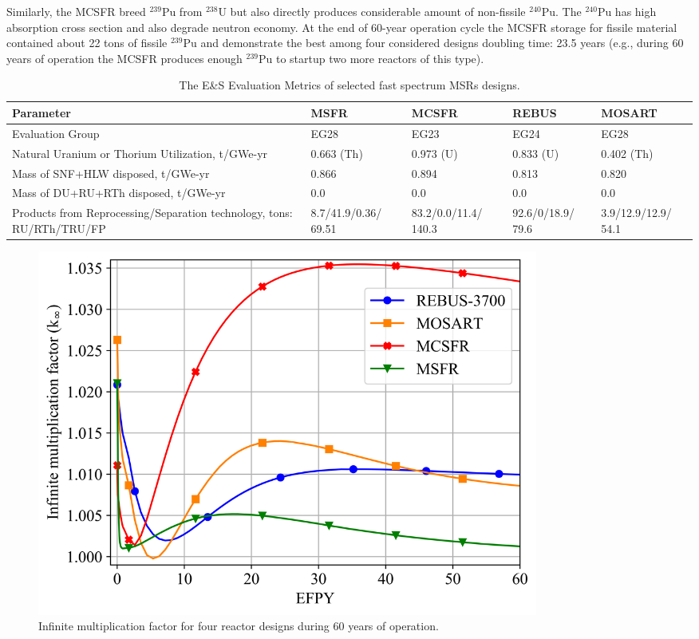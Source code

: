 \documentclass[letterpaper]{mandc2019}
\begin{document}
Similarly, the \gls{MCSFR} breed $^{239}$Pu from $^{238}$U but also directly produces considerable amount of non-fissile $^{240}$Pu. The $^{240}$Pu has high absorption cross section and also degrade neutron economy. At the end of 60-year operation cycle the \gls{MCSFR} storage for fissile material contained about 22 tons of fissile $^{239}$Pu and demonstrate the best among four considered designs doubling time: 23.5 years (e.g., during 60 years of operation the \gls{MCSFR} produces enough $^{239}$Pu to startup two more reactors of this type).

\begin{table}[hb!]
  \centering
  \caption{The E\&S Evaluation Metrics of selected fast spectrum \glspl{MSR} designs.}
  \label{table:metrics}
  \begin{tabular}{p{} p{} p{} p{} p{}} \toprule
   Parameter &  \gls{MSFR} & \gls{MCSFR} & REBUS & \gls{MOSART} \\ \midrule
   Evaluation Group	&  EG28 & EG23 & EG24 & EG28   \\
   Natural Uranium or Thorium Utilization, t/GWe-yr & 0.663 (Th) & 0.973 (U) & 0.833 (U) & 0.402 (Th) \\
   Mass of \gls{SNF}+\gls{HLW} disposed, t/GWe-yr & 0.866 & 0.894 & 0.813 &  0.820 \\
   Mass of DU+RU+RTh disposed, t/GWe-yr & 0.0 & 0.0 & 0.0 &  0.0 \\
   Products from Reprocessing/Separation technology, tons: \gls{RU}/\gls{RTh}/\gls{TRU}/\gls{FP} &
   8.7/41.9/0.36/ 69.51 &  83.2/0.0/11.4/ 140.3 & 92.6/0/18.9/ 79.6 & 3.9/12.9/12.9/ 54.1  \\
 \bottomrule
  \end{tabular}
\end{table}
\begin{figure}[!htb]
  \centering
  \includegraphics[width=0.8\textwidth]{./Figures/k_inf.png}
  \caption{Infinite multiplication factor for four reactor designs during 60 years of operation.}
  \label{fig:k_inf}
\end{figure}
\end{document}
